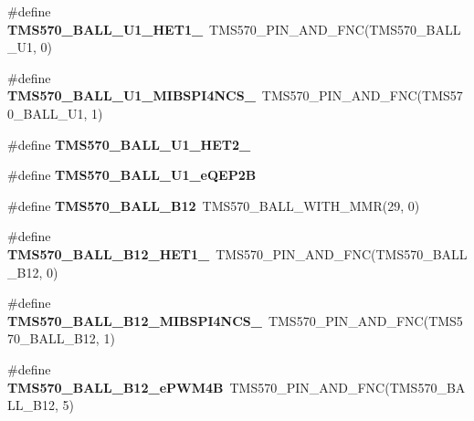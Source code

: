 \begin{DoxyCompactItemize}
\item 
\mbox{\label{tms570lc4357-pins_8h_a7d8486b03b3765b9da05175b80fd52c3}} 
\#define {\bfseries T\+M\+S570\+\_\+\+B\+A\+L\+L\+\_\+\+U1\+\_\+\+H\+E\+T1\+\_}~T\+M\+S570\+\_\+\+P\+I\+N\+\_\+\+A\+N\+D\+\_\+\+F\+NC(T\+M\+S570\+\_\+\+B\+A\+L\+L\+\_\+\+U1, 0)
\item 
\mbox{\label{tms570lc4357-pins_8h_a149b275d8ef150e87c88335de288bd3d}} 
\#define {\bfseries T\+M\+S570\+\_\+\+B\+A\+L\+L\+\_\+\+U1\+\_\+\+M\+I\+B\+S\+P\+I4\+N\+C\+S\+\_}~T\+M\+S570\+\_\+\+P\+I\+N\+\_\+\+A\+N\+D\+\_\+\+F\+NC(T\+M\+S570\+\_\+\+B\+A\+L\+L\+\_\+\+U1, 1)
\item 
\#define {\bfseries T\+M\+S570\+\_\+\+B\+A\+L\+L\+\_\+\+U1\+\_\+\+H\+E\+T2\+\_}
\item 
\#define {\bfseries T\+M\+S570\+\_\+\+B\+A\+L\+L\+\_\+\+U1\+\_\+e\+Q\+E\+P2B}
\item 
\mbox{\label{tms570lc4357-pins_8h_a982ac7a0d9e62fc8d4fe6e297a90e02e}} 
\#define {\bfseries T\+M\+S570\+\_\+\+B\+A\+L\+L\+\_\+\+B12}~T\+M\+S570\+\_\+\+B\+A\+L\+L\+\_\+\+W\+I\+T\+H\+\_\+\+M\+MR(29, 0)
\item 
\mbox{\label{tms570lc4357-pins_8h_a8014bf7509de183c28b1d2ed34f66b25}} 
\#define {\bfseries T\+M\+S570\+\_\+\+B\+A\+L\+L\+\_\+\+B12\+\_\+\+H\+E\+T1\+\_}~T\+M\+S570\+\_\+\+P\+I\+N\+\_\+\+A\+N\+D\+\_\+\+F\+NC(T\+M\+S570\+\_\+\+B\+A\+L\+L\+\_\+\+B12, 0)
\item 
\mbox{\label{tms570lc4357-pins_8h_a02b10aeebc5abd5c9f297f5d34d305a3}} 
\#define {\bfseries T\+M\+S570\+\_\+\+B\+A\+L\+L\+\_\+\+B12\+\_\+\+M\+I\+B\+S\+P\+I4\+N\+C\+S\+\_}~T\+M\+S570\+\_\+\+P\+I\+N\+\_\+\+A\+N\+D\+\_\+\+F\+NC(T\+M\+S570\+\_\+\+B\+A\+L\+L\+\_\+\+B12, 1)
\item 
\mbox{\label{tms570lc4357-pins_8h_ab7ef3aee405dbadd98afcc5b7837fd41}} 
\#define {\bfseries T\+M\+S570\+\_\+\+B\+A\+L\+L\+\_\+\+B12\+\_\+e\+P\+W\+M4B}~T\+M\+S570\+\_\+\+P\+I\+N\+\_\+\+A\+N\+D\+\_\+\+F\+NC(T\+M\+S570\+\_\+\+B\+A\+L\+L\+\_\+\+B12, 5)
\item 
\mbox{\label{tms570lc4357-pins_8h_a096a16351849a2b4edce1ae9c88675af}} 

\end{DoxyCompactItemize}
